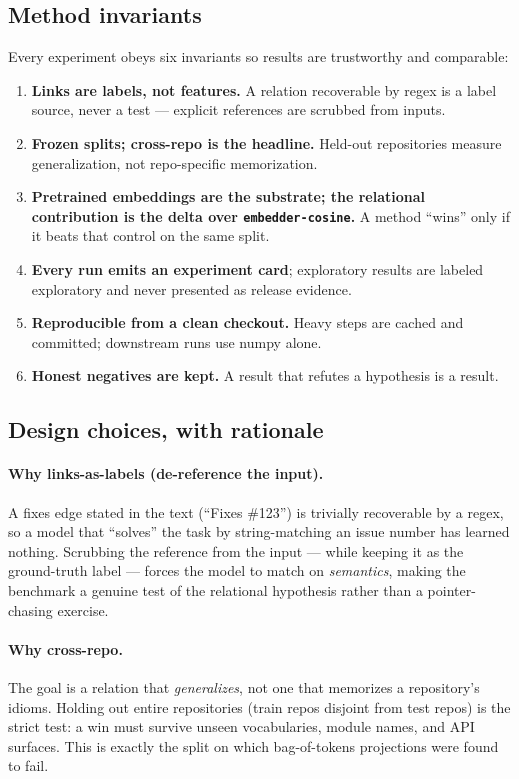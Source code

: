 \documentclass[11pt]{article}
\newcommand{\code}[1]{\texttt{#1}}
\newcommand{\rel}[1]{\textsf{#1}}
\begin{document}
\subsection{Method invariants}

Every experiment obeys six invariants so results are trustworthy and comparable:
\begin{enumerate}[leftmargin=1.6em,nosep]
\item \textbf{Links are labels, not features.} A relation recoverable by regex is a
label source, never a test --- explicit references are scrubbed from inputs.
\item \textbf{Frozen splits; cross-repo is the headline.} Held-out repositories
measure generalization, not repo-specific memorization.
\item \textbf{Pretrained embeddings are the substrate; the relational contribution
is the delta over \code{embedder-cosine}.} A method ``wins'' only if it beats that
control on the same split.
\item \textbf{Every run emits an experiment card}; exploratory results are labeled
exploratory and never presented as release evidence.
\item \textbf{Reproducible from a clean checkout.} Heavy steps are cached and
committed; downstream runs use numpy alone.
\item \textbf{Honest negatives are kept.} A result that refutes a hypothesis is a
result.
\end{enumerate}

\subsection{Design choices, with rationale}
\label{sec:design}

\paragraph{Why links-as-labels (de-reference the input).}
A \rel{fixes} edge stated in the text (``Fixes \#123'') is trivially recoverable by
a regex, so a model that ``solves'' the task by string-matching an issue number has
learned nothing. Scrubbing the reference from the input --- while keeping it as the
ground-truth label --- forces the model to match on \emph{semantics}, making the
benchmark a genuine test of the relational hypothesis rather than a pointer-chasing
exercise.

\paragraph{Why cross-repo.}
The goal is a relation that \emph{generalizes}, not one that memorizes a
repository's idioms. Holding out entire repositories (train repos disjoint from test
repos) is the strict test: a win must survive unseen vocabularies, module names, and
API surfaces. This is exactly the split on which bag-of-tokens projections were
found to fail.
\end{document}
